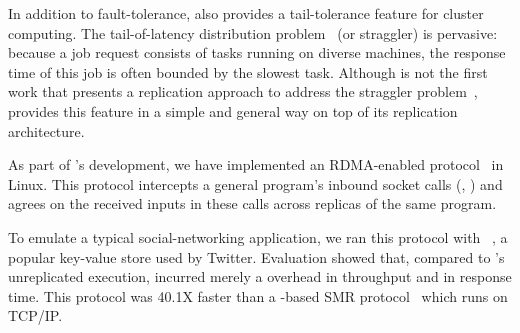 


In addition to fault-tolerance, \xxx also provides a tail-tolerance 
feature for cluster computing. The tail-of-latency distribution 
problem~\cite{tail:cacm13} (or straggler) is pervasive: because a 
job request consists of tasks running on diverse machines, the response time of 
this job is often bounded by the slowest task. Although \xxx is not the first 
work that presents a replication approach to address the straggler 
problem~\cite{dolly:nsdi13}, \xxx provides this feature in a simple and general 
way on top of its \paxos replication architecture.


As part of \xxx's development, we have implemented an RDMA-enabled \paxos 
protocol~\cite{falcon:github} in Linux. This protocol intercepts a general 
program's inbound socket calls (\eg, \recv) and agrees on the received inputs 
in these calls across replicas of the same program.

To emulate a typical social-networking application, we ran this protocol with 
\redis~\cite{redis}, a popular key-value store used by Twitter. Evaluation 
showed that, compared to \redis's unreplicated execution, \xxx incurred merely a 
\tputoverhead overhead in throughput and \latencyoverhead in response time. 
This protocol was 40.1X faster than a \zookeeper-based
SMR protocol~\cite{calvin:sigmod12} which runs on TCP/IP.

